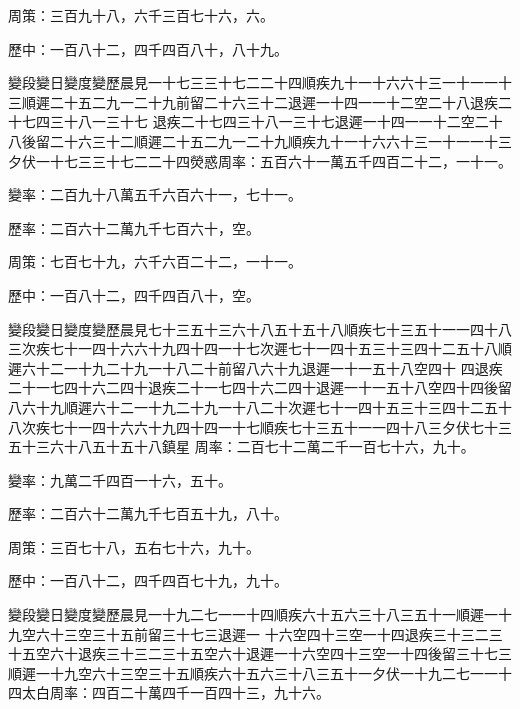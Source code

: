 \begin{pinyinscope}
 周策：三百九十八，六千三百七十六，六。



 歷中：一百八十二，四千四百八十，八十九。



 變段變日變度變歷晨見一十七三三十七二二十四順疾九十一十六六十三一十一一十三順遲二十五二九一二十九前留二十六三十二退遲一十四一一十二空二十八退疾二十七四三十八一三十七
 退疾二十七四三十八一三十七退遲一十四一一十二空二十八後留二十六三十二順遲二十五二九一二十九順疾九十一十六六十三一十一一十三夕伏一十七三三十七二二十四熒惑周率：五百六十一萬五千四百二十二，一十一。



 變率：二百九十八萬五千六百六十一，七十一。



 歷率：二百六十二萬九千七百六十，空。



 周策：七百七十九，六千六百二十二，一十一。



 歷中：一百八十二，四千四百八十，空。



 變段變日變度變歷晨見七十三五十三六十八五十五十八順疾七十三五十一一四十八三次疾七十一四十六六十九四十四一十七次遲七十一四十五三十三四十二五十八順遲六十二一十九二十九一十八二十前留八六十九退遲一十一五十八空四十
 四退疾二十一七四十六二四十退疾二十一七四十六二四十退遲一十一五十八空四十四後留八六十九順遲六十二一十九二十九一十八二十次遲七十一四十五三十三四十二五十八次疾七十一四十六六十九四十四一十七順疾七十三五十一一四十八三夕伏七十三五十三六十八五十五十八鎮星
 周率：二百七十二萬二千一百七十六，九十。



 變率：九萬二千四百一十六，五十。



 歷率：二百六十二萬九千七百五十九，八十。



 周策：三百七十八，五右七十六，九十。



 歷中：一百八十二，四千四百七十九，九十。



 變段變日變度變歷晨見一十九二七一一十四順疾六十五六三十八三五十一順遲一十九空六十三空三十五前留三十七三退遲一
 十六空四十三空一十四退疾三十三二三十五空六十退疾三十三二三十五空六十退遲一十六空四十三空一十四後留三十七三順遲一十九空六十三空三十五順疾六十五六三十八三五十一夕伏一十九二七一一十四太白周率：四百二十萬四千一百四十三，九十六。




\end{pinyinscope}
